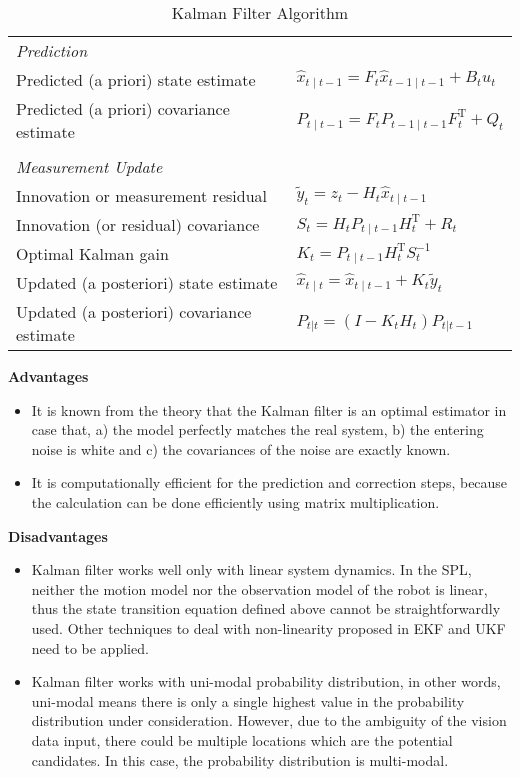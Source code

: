 \begin{table}[h!]
\begin{adjustbox}{max width=\textwidth}
  \centering
  \begin{tabular}{ll}
 \textit{Prediction} & \\
Predicted (a priori) state estimate & $\hat{x}_{t\mid t-1} = F_{t}\hat{x}_{t-1\mid t-1} + B_{t} u_{t}$ \\
Predicted (a priori) covariance estimate & $P_{t\mid t-1} =  F_{t} P_{t-1\mid t-1} F_{t}^{\text{T}} + Q_{t}$\\
&\\
\textit{Measurement Update} & \\
Innovation or measurement residual & $\tilde{y}_t = z_t - H_t\hat{x}_{t\mid t-1}$ \\
Innovation (or residual) covariance & $S_t = H_t P_{t\mid t-1} H_t^\text{T} + R_t$ \\
Optimal Kalman gain & $K_t = P_{t\mid t-1}H_t^\text{T}S_t^{-1}$ \\
Updated (a posteriori) state estimate & $\hat{x}_{t\mid t} = \hat{x}_{t\mid t-1} + K_t\tilde{y}_t$ \\
Updated (a posteriori) covariance estimate & $P_{t|t} = (I - K_t H_t) P_{t|t-1}$ \\
  \end{tabular}
  \end{adjustbox}
  \caption{Kalman Filter Algorithm}
  \label{tab:kf}
\end{table}

\noindent\textbf{Advantages}
\begin{itemize}
  \item  It is known from the theory that the Kalman filter is an optimal estimator in case that, a) the model perfectly matches the real system, b) the entering noise is white and c) the covariances of the noise are exactly known.
  \item  It is computationally efficient for the prediction and correction steps, because the calculation can be done efficiently using matrix multiplication.
\end{itemize}

\noindent\textbf{Disadvantages}
\begin{itemize}
  \item  Kalman filter works well only with linear system dynamics. In the SPL, neither the motion model nor the observation model of the robot is linear, thus the state transition equation defined above cannot be straightforwardly used. Other techniques to deal with non-linearity proposed in \gls{EKF} and \gls{UKF} need to be applied.
  \item  Kalman filter works with uni-modal probability distribution, in other words, uni-modal means there is only a single highest value in the probability distribution under consideration. However, due to the ambiguity of the vision data input, there could be multiple locations which are the potential candidates. In this case, the probability distribution is multi-modal.
\end{itemize}

